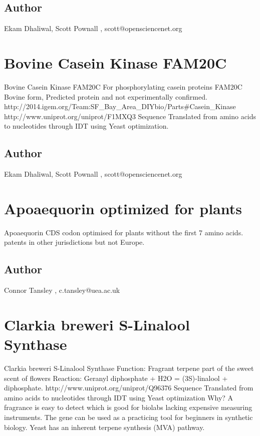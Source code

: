 \documentclass{article}%
\begin{document}
\subsection{Author}%
Ekam Dhaliwal, Scott Pownall%
,%
scott@opensciencenet.org

%
\section{Bovine Casein Kinase FAM20C}%
Bovine Casein Kinase FAM20C\newline%
For phosphorylating casein proteins FAM20C \newline%
Bovine form, Predicted protein and not experimentally confirmed.\newline%
http://2014.igem.org/Team:SF\_Bay\_Area\_DIYbio/Parts\#Casein\_Kinase\newline%
http://www.uniprot.org/uniprot/F1MXQ3\newline%
Sequence Translated from amino acids to nucleotides through IDT using Yeast optimization.%
\subsection{Author}%
Ekam Dhaliwal, Scott Pownall%
,%
scott@opensciencenet.org

%
\section{Apoaequorin optimized for plants}%
Apoaequorin CDS codon optimised for plants without the first 7 amino acids. patents in other jurisdictions but not Europe.%
\subsection{Author}%
Connor Tansley%
,%
c.tansley@uea.ac.uk

%
\section{Clarkia breweri S{-}Linalool Synthase}%
Clarkia breweri S{-}Linalool Synthase\newline%
Function: Fragrant terpene part of the sweet scent of flowers \newline%
Reaction: Geranyl diphosphate + H2O = (3S){-}linalool + diphosphate.\newline%
http://www.uniprot.org/uniprot/Q96376\newline%
Sequence Translated from amino acids to nucleotides through IDT using Yeast optimization \newline%
Why? A fragrance is easy to detect which is good for biolabs lacking expensive measuring instruments. The gene can be used as a practicing tool for beginners in synthetic biology. Yeast has an inherent terpene synthesis (MVA) pathway. %
\end{document}
